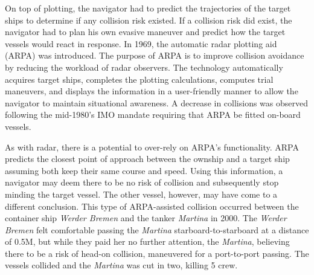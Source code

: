 \documentclass[twoside,symmetric,notoc]{tufte-book}
\begin{document}
\par{%
On top of plotting, the navigator had to predict the trajectories of the target ships to determine if any collision risk existed. If a collision risk did exist, the navigator had to plan his own evasive maneuver and predict how the target vessels would react in response.\cite{Peterson}  In 1969, the automatic radar plotting aid (ARPA) was introduced. The purpose of ARPA is to improve collision avoidance by reducing the workload of radar observers. The technology automatically acquires target ships, completes the plotting calculations, computes trial maneuvers, and displays the information in a user-friendly manner to allow the navigator to maintain situational awareness.\cite{Bole} A decrease in collisions was observed following the mid-1980's IMO mandate requiring that ARPA be fitted on-board vessels.\cite{Tiblin} 
}
\par{%
As with radar, there is a potential to over-rely on ARPA's functionality. ARPA predicts the closest point of approach between the ownship and a target ship assuming both keep their same course and speed. Using this information, a navigator may deem there to be no risk of collision  and subsequently stop minding the target vessel. The other vessel, however, may have come to a different conclusion. This type of ARPA-assisted collision occurred between the container ship \textit{Werder Bremen} and the tanker \textit{Martina} in 2000. The \textit{Werder Bremen} felt comfortable passing the \textit{Martina} starboard-to-starboard at a distance of 0.5M, but while they paid her no further attention, the \textit{Martina}, believing there to be a risk of head-on collision, maneuvered for a port-to-port passing. The vessels collided and the \textit{Martina} was cut in two, killing 5 crew.\cite[-0.5in]{SMA} 
}
\end{document}
